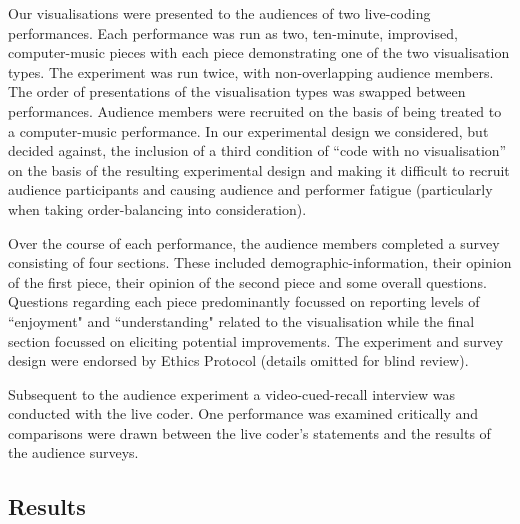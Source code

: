 \documentclass{sig-alternate}
\begin{document}
Our visualisations were presented to the audiences of two live-coding performances. Each performance was run as two, ten-minute, improvised, computer-music pieces with each piece demonstrating one of the two visualisation types. The experiment was run twice, with non-overlapping audience members. The order of presentations of the visualisation types was swapped between performances. Audience members were recruited on the basis of being treated to a computer-music performance. In our experimental design we considered, but decided against, the inclusion of a third condition of ``code with no visualisation'' on the basis of the resulting experimental design and making it difficult to recruit audience participants and causing audience and performer fatigue (particularly when taking order-balancing into consideration). 

Over the course of each performance, the audience members completed a survey consisting of four sections. These included demographic-information, their opinion of the first piece, their opinion of the second piece and some overall questions. 
Questions regarding each piece predominantly focussed on reporting levels of ``enjoyment" and ``understanding" related to the visualisation while the final section focussed on eliciting potential improvements. The experiment and survey design were endorsed by Ethics Protocol (details omitted for blind review).


Subsequent to the audience experiment a video-cued-recall interview was conducted with the live coder. One performance was examined critically and comparisons were drawn between the live coder's statements and the results of the audience surveys.

\subsection{Results}
\end{document}
